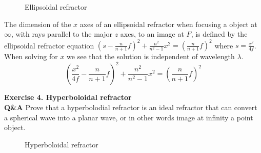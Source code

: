 \documentclass[main.tex]{subfiles}
\begin{document}
\begin{figure}
\centering{}
\caption{Ellipsoidal refractor}
\label{fig:3}
\end{figure}

The dimension of the $x$ axes of an ellipsoidal refractor when focusing a object at $\infty$, with rays parallel to the major $z$ axes, to an image at $F$, is defined by the ellipsoidal refractor equation $\left(s-\frac{n}{n+1}f \right)^2 + \frac{n^2}{n^2 - 1}x^2 = \left(\frac{n}{n+1}f \right)^2$ where $s=\frac{x^2}{4f}$. When solving for $x$ we see that the solution is independent of wavelength $\lambda$.\\

\begin{equation}
\left(\frac{x^2}{4f}-\frac{n}{n+1}f \right)^2 + \frac{n^2}{n^2 - 1}x^2 = \left(\frac{n}{n+1}f \right)^2
\end{equation}

\textbf{Exercise 4. Hyperboloidal refractor}\\

\textbf{Q\&A} Prove that a hyperbolodial refractor is an ideal refractor that can convert a spherical wave into a planar wave, or in other words image at infinity a point object.\\

\begin{figure}
\centering{}
\caption{Hyperboloidal refractor}
\label{fig:4}
\end{figure}
\end{document}
